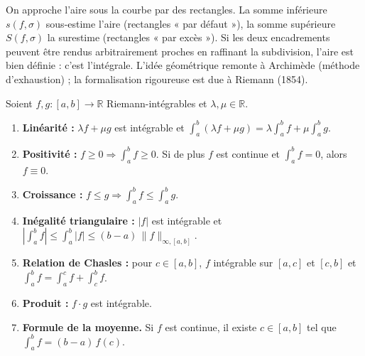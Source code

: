 \begin{significationintuitive}
On approche l'aire sous la courbe par des rectangles. La somme inférieure
$s(f,\sigma)$ sous-estime l'aire (rectangles « par défaut »), la somme
supérieure $S(f,\sigma)$ la surestime (rectangles « par excès »).
Si les deux encadrements peuvent être rendus arbitrairement proches en
raffinant la subdivision, l'aire est bien définie : c'est l'intégrale.
L'idée géométrique remonte à Archimède (méthode d'exhaustion) ; la
formalisation rigoureuse est due à Riemann (1854).
\end{significationintuitive}

\decsep{}


\begin{tcolorbox}[thmbox]
  Soient $f, g : [a,b] \to \mathbb{R}$ Riemann-intégrables et
  $\lambda, \mu \in \mathbb{R}$.
  \begin{enumerate}
    \item \textbf{Linéarité :}
          $\lambda f + \mu g$ est intégrable et
          $\displaystyle\int_a^b (\lambda f + \mu g) = \lambda\!\int_a^b f + \mu\!\int_a^b g$.

    \item \textbf{Positivité :}
          $f \geq 0 \Rightarrow \int_a^b f \geq 0$.
          Si de plus $f$ est continue et $\int_a^b f = 0$, alors $f \equiv 0$.

    \item \textbf{Croissance :}
          $f \leq g \Rightarrow \int_a^b f \leq \int_a^b g$.

    \item \textbf{Inégalité triangulaire :}
          $|f|$ est intégrable et
          $\displaystyle\left|\int_a^b f\right| \leq \int_a^b |f| \leq (b-a)\,\|f\|_{\infty,[a,b]}$.

    \item \textbf{Relation de Chasles :}
          pour $c\in[a,b]$, $f$ intégrable sur $[a,c]$ et $[c,b]$ et
          $\displaystyle\int_a^b f = \int_a^c f + \int_c^b f$.

    \item \textbf{Produit :} $f\cdot g$ est intégrable.

    \item \textbf{Formule de la moyenne.}\enspace{}
          Si $f$ est continue, il existe $c\in[a,b]$ tel que
          $\displaystyle\int_a^b f = (b-a)\,f(c)$.
  \end{enumerate}
\end{tcolorbox}

